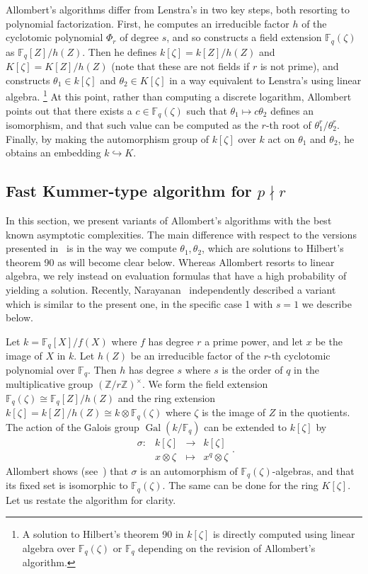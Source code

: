 \documentclass[12pt]{article}
\theoremstyle{plain}
\theoremstyle{definition}
\DeclareMathOperator{\gal}{Gal} %
\def\Z{\ensuremath{\mathbb{Z}}}
\def\F{\ensuremath{\mathbb{F}}}
\newcounter{algorithm}
\begin{document}
Allombert's algorithms differ from Lenstra's in two key steps, both
resorting to polynomial factorization.
First, he computes an irreducible factor $h$ of the cyclotomic
polynomial $\Phi_r$ of degree $s$,
and so constructs a field extension $\F_q(\zeta)$ as $\F_q[Z]/h(Z)$.
Then he defines $k[\zeta]=k[Z]/h(Z)$ and $K[\zeta]=K[Z]/h(Z)$
(note that these are not fields if $r$ is not prime), and constructs
$\theta_1\in k[\zeta]$ and $\theta_2\in K[\zeta]$ in a way equivalent
to Lenstra's using linear algebra.%
\footnote{
A solution to Hilbert's theorem 90 in $k[\zeta]$ is directly
computed using linear algebra over $\F_q(\zeta)$ or $\F_q$
depending on the revision of Allombert's algorithm.}
At this point, rather than computing a discrete
logarithm, Allombert points out that there exists a $c\in\F_q(\zeta)$
such that $\theta_1\mapsto c\theta_2$ defines an isomorphism,
and that such value can be
computed as the $r$-th root of $\theta_1^r/\theta_2^r$.
Finally, by making the automorphism group of $k[\zeta]$ over $k$ act
on $\theta_1$ and $\theta_2$, he obtains an embedding $k \hookrightarrow K$.%


\subsection{Fast Kummer-type algorithm for $p \nmid r$}
\label{sec:fast-kummer}

In this section, we present variants of Allombert's algorithms with the
best known asymptotic complexities. The main difference with respect to the 
versions presented in~\cite{Allombert02,Allombert02-rev} is in the way
we compute $\theta_1, \theta_2$, which are solutions to Hilbert's theorem 90
as will become clear below.
Whereas Allombert resorts to linear algebra, we rely instead on evaluation
formulas that have a high probability of yielding a solution.
Recently, Narayanan~\cite[Sec.~3]{narayanan2016fast} independently described 
a variant which is similar to the present one,
in the specific case 1 with $s=1$ we describe below.

Let $k=\F_q[X]/f(X)$ where $f$ has degree $r$ a prime power, and let $x$ be the image of $X$ in $k$.
Let $h(Z)$ be an 
irreducible factor of the $r$-th cyclotomic polynomial over $\F_q$. Then $h$ has degree $s$ where 
$s$ is the order of $q$ in the multiplicative group $(\Z/r\Z)^\times$. We form the field extension
$\F_q(\zeta) \cong \F_q[Z] / h(Z)$ and the ring extension $k[\zeta] = k[Z] / h(Z) \cong k \otimes
\F_q(\zeta)$ where $\zeta$ is the image of $Z$ in the quotients. The action of the Galois group
$\gal(k / \F_q)$ can be extended to $k[\zeta]$ by
\[
\left.
\begin{array}{llll}
\sigma: & k[\zeta] & \rightarrow & k[\zeta] \\
& x \otimes \zeta & \mapsto & x^q \otimes \zeta
\end{array}
\right.
.
\]
Allombert shows (see~\cite[Prop.~3.2]{Allombert02}) that $\sigma$ is
an automorphism of $\F_q(\zeta)$-algebras, and that its fixed set is
isomorphic to $\F_q(\zeta)$.
The same can be done for the ring $K[\zeta]$.
Let us restate the algorithm for clarity.
\end{document}
